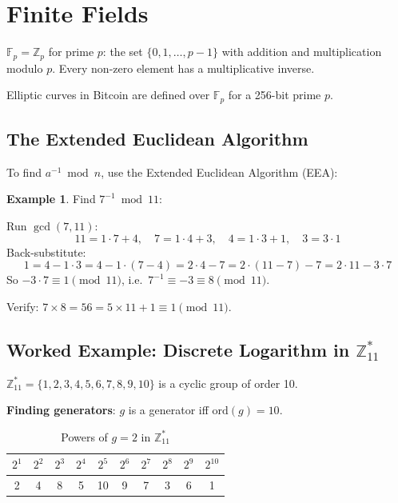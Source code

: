 \documentclass[12pt,a4paper,openany]{book}
\theoremstyle{definition}
\newtheorem{example}{Example}[chapter]
\theoremstyle{plain}
\theoremstyle{remark}
\begin{document}
\section{Finite Fields}

\begin{definitionbox}
  $\mathbb{F}_p=\mathbb{Z}_p$ for prime $p$: the set $\{0,1,\ldots,p-1\}$
  with addition and multiplication modulo $p$.  Every non-zero element has
  a multiplicative inverse.
\end{definitionbox}

Elliptic curves in Bitcoin are defined over $\mathbb{F}_p$ for a 256-bit prime $p$.

\subsection{The Extended Euclidean Algorithm}

To find $a^{-1}\bmod n$, use the Extended Euclidean Algorithm (EEA):

\begin{example}
  Find $7^{-1}\bmod 11$:

  Run $\gcd(7,11)$:
  \[
    11 = 1\cdot 7 + 4,\quad 7 = 1\cdot 4+3,\quad 4=1\cdot 3+1,\quad
    3=3\cdot 1
  \]
  Back-substitute:
  \[
    1 = 4 - 1\cdot 3 = 4 - 1\cdot(7-4) = 2\cdot 4 - 7
      = 2\cdot(11-7) - 7 = 2\cdot 11 - 3\cdot 7
  \]
  So $-3\cdot 7\equiv 1\pmod{11}$, i.e.\ $7^{-1}\equiv -3\equiv 8\pmod{11}$.

  Verify: $7\times 8 = 56 = 5\times 11 + 1\equiv 1\pmod{11}$. \checkmark
\end{example}

\subsection{Worked Example: Discrete Logarithm in $\mathbb{Z}_{11}^*$}

$\mathbb{Z}_{11}^* = \{1,2,3,4,5,6,7,8,9,10\}$ is a cyclic group of
order 10.

\textbf{Finding generators}: $g$ is a generator iff $\mathrm{ord}(g)=10$.

\begin{table}[h]
\centering
\caption{Powers of $g=2$ in $\mathbb{Z}_{11}^*$}
\begin{tabular}{cccccccccc}
\toprule
$2^1$ & $2^2$ & $2^3$ & $2^4$ & $2^5$ & $2^6$ & $2^7$ & $2^8$ & $2^9$ & $2^{10}$ \\
\midrule
2 & 4 & 8 & 5 & 10 & 9 & 7 & 3 & 6 & 1 \\
\bottomrule
\end{tabular}
\end{table}
\end{document}
